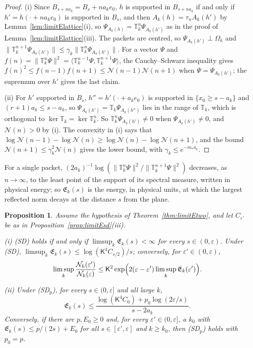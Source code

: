 \documentclass[aps,prd,twocolumn,superscriptaddress,nofootinbib,longbibliography,floatfix,amsmath,amssymb,10pt]{revtex4-2}
\newtheorem{proposition}[theorem]{Proposition}
\theoremstyle{definition}
\theoremstyle{remark}
\newcommand{\ip}[2]{\langle #1,#2\rangle}
\begin{document}
\begin{proof}
(i) Since $B_{s+na_k}=B_s+na_ke_0$, $h$ is supported in $B_{s+na_k}$ if and
only if $h'=h(\cdot+na_ke_0)$ is supported in $B_s$, and then $A_k(h)=
\tau_nA_k(h')$ by Lemma~\ref{lem:limitElattice}(i), so $\Psi_{A_k(h)}=
\mathbb T_k^n\Psi_{A_k(h')}$ as in the proof of
Lemma~\ref{lem:limitElattice}(iii). The packets are centred, so
$\Psi_{A_k(h')}\perp\Omega_k$ and $\|\mathbb T_k^{n+1}\Psi_{A_k(h')}\|\le
\gamma_k\|\mathbb T_k^n\Psi_{A_k(h')}\|$. For a vector $\Psi$ and
$f(n)=\|\mathbb T_k^n\Psi\|^2=\ip{\mathbb T_k^{n-1}\Psi}{\mathbb
T_k^{n+1}\Psi}$, the Cauchy--Schwarz inequality gives $f(n)^2\le f(n-1)
f(n+1)\le\mathcal N(n-1)\mathcal N(n+1)$ when $\Psi=\Psi_{A_k(h')}$;
the supremum over $h'$ gives the last claim.

(ii) For $h'$ supported in $B_s$, $h''=h'(\cdot+a_ke_0)$ is supported in
$\{x_0\ge s-a_k\}$ and $(r+1)a_k\le s-a_k$, so $\Psi_{A_k(h')}=\mathbb T_k
\Psi_{A_k(h'')}$ lies in the range of $\mathbb T_k$, which is orthogonal to
$\ker\mathbb T_k=\ker\mathbb T_k^n$. So $\mathbb T_k^n\Psi_{A_k(h')}\ne0$
when $\Psi_{A_k(h')}\ne0$, and $\mathcal N(n)>0$ by (i). The convexity in
(i) says that $\log\mathcal N(n-1)-\log\mathcal N(n)\ge\log\mathcal N(n)-
\log\mathcal N(n+1)$, and the bound $\mathcal N(n+1)\le\gamma_k^2
\mathcal N(n)$ gives the lower bound, with $\gamma_k\le e^{-m_*a_k}$.
\end{proof}

For a single packet, $(2a_k)^{-1}\log(\|\mathbb T_k^n\Psi\|^2/
\|\mathbb T_k^{n+1}\Psi\|^2)$ decreases, as $n\to\infty$, to the least point
of the support of its spectral measure, written in physical energy; so
$\mathfrak E_k(s)$ is the energy, in physical units, at which the largest
reflected norm decays at the distance $s$ from the plane.

\begin{proposition}\label{prop:limitEenergy}
Assume the hypothesis of Theorem~\textup{\ref{thm:limitEtwo}}, and let
$C_{\varepsilon'}$ be as in Proposition~\textup{\ref{prop:limitEsd}(iii)}.

\textup{(i)} \textup{(SD)} holds if and only if $\limsup_k\mathfrak
E_k(s)<\infty$ for every $s\in(0,\varepsilon)$. Under \textup{(SD)},
$\limsup_k\mathfrak E_k(s)\le\log(\mathsf K^4C_{s/2})/s$; conversely, for
$\varepsilon'\in(0,\varepsilon)$,
\[
\limsup_k\frac{\mathcal N_k(\varepsilon')}{\mathcal N_k(\varepsilon)}\le
\mathsf K^2\exp\Bigl(2(\varepsilon-\varepsilon')\limsup_k\mathfrak
E_k(\varepsilon')\Bigr).
\]

\textup{(ii)} Under \textup{(SD$_{\mathrm p}$)}, for every $s\in(0,
\varepsilon]$ and all large $k$,
\[
\mathfrak E_k(s)\le\frac{\log(\mathsf K^4C_0)+p_0\log(2\varepsilon/s)}
{s-2a_k} .
\]
Conversely, if there are $p,E_0\ge0$ and, for every $\varepsilon'\in(0,
\varepsilon]$, a $k_0$ with $\mathfrak E_k(s)\le p/(2s)+E_0$ for all
$s\in[\varepsilon',\varepsilon]$ and $k\ge k_0$, then
\textup{(SD$_{\mathrm p}$)} holds with $p_0=p$.
\end{proposition}
\end{document}
